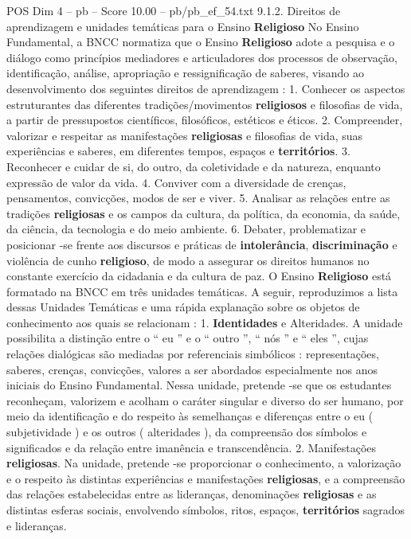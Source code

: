 \begin{textsample}{POS Dim 4 – pb – Score 10.00 – pb/pb\_ef\_54.txt}  \label{ex:f4_pos_263}
9.1.2.
Direitos de aprendizagem e unidades temáticas para o Ensino \textbf{Religioso} No Ensino Fundamental, a BNCC normatiza que o Ensino \textbf{Religioso} adote a pesquisa e o diálogo como princípios mediadores e articuladores dos processos de observação, identificação, análise, apropriação e ressignificação de saberes, visando ao desenvolvimento dos seguintes direitos de aprendizagem : 1.
Conhecer os aspectos estruturantes das diferentes tradições/movimentos \textbf{religiosos} e filosofias de vida, a partir de pressupostos científicos, filosóficos, estéticos e éticos. 2.
Compreender, valorizar e respeitar as manifestações \textbf{religiosas} e filosofias de vida, suas experiências e saberes, em diferentes tempos, espaços e \textbf{territórios}. 3.
Reconhecer e cuidar de si, do outro, da coletividade e da natureza, enquanto expressão de valor da vida. 4.
Conviver com a diversidade de crenças, pensamentos, convicções, modos de ser e viver. 5.
Analisar as relações entre as tradições \textbf{religiosas} e os campos da cultura, da política, da economia, da saúde, da ciência, da tecnologia e do meio ambiente. 6.
Debater, problematizar e posicionar -se frente aos discursos e práticas de \textbf{intolerância}, \textbf{discriminação} e violência de cunho \textbf{religioso}, de modo a assegurar os direitos humanos no constante exercício da cidadania e da cultura de paz.
O Ensino \textbf{Religioso} está formatado na BNCC em três unidades temáticas.
A seguir, reproduzimos a lista dessas Unidades Temáticas e uma rápida explanação sobre os objetos de conhecimento aos quais se relacionam : 1. \textbf{Identidades} e Alteridades.
A unidade possibilita a distinção entre o “ eu ” e o “ outro ”, “ nós ” e “ eles ”, cujas relações dialógicas são mediadas por referenciais simbólicos : representações, saberes, crenças, convicções, valores a ser abordados especialmente nos anos iniciais do Ensino Fundamental.
Nessa unidade, pretende -se que os estudantes reconheçam, valorizem e acolham o caráter singular e diverso do ser humano, por meio da identificação e do respeito às semelhanças e diferenças entre o eu ( subjetividade ) e os outros ( alteridades ), da compreensão dos símbolos e significados e da relação entre imanência e transcendência. 2.
Manifestações \textbf{religiosas}.
Na unidade, pretende -se proporcionar o conhecimento, a valorização e o respeito às distintas experiências e manifestações \textbf{religiosas}, e a compreensão das relações estabelecidas entre as lideranças, denominações \textbf{religiosas} e as distintas esferas sociais, envolvendo símbolos, ritos, espaços, \textbf{territórios} sagrados e lideranças.

\end{textsample}
